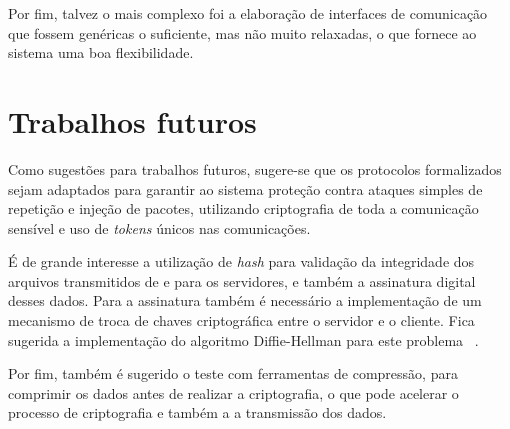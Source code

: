     Por fim, talvez o mais complexo foi a elaboração de interfaces de comunicação que fossem genéricas o suficiente, mas não muito relaxadas, o que fornece ao sistema uma boa flexibilidade.
    
    \section{Trabalhos futuros}
    
    Como sugestões para trabalhos futuros, sugere-se que os protocolos formalizados sejam adaptados para garantir ao sistema proteção contra ataques simples de repetição e injeção de pacotes, utilizando criptografia de toda a comunicação sensível e uso de \textit{tokens} únicos nas comunicações.
    
    É de grande interesse a utilização de \textit{hash} para validação da integridade dos arquivos transmitidos de e para os servidores, e também a assinatura digital desses dados. Para a assinatura também é necessário a implementação de um mecanismo de troca de chaves criptográfica entre o servidor e o cliente. Fica sugerida a implementação do algoritmo Diffie-Hellman para este problema ~\cite{merkle1978secure}.
    
    Por fim, também é sugerido o teste com ferramentas de compressão, para comprimir os dados antes de realizar a criptografia, o que pode acelerar o processo de criptografia e também a a transmissão dos dados.